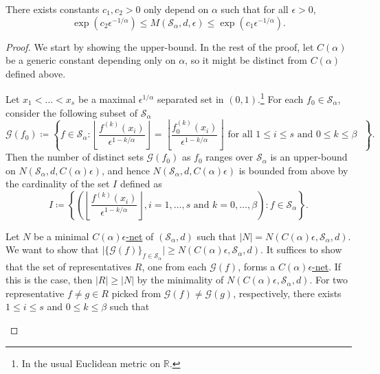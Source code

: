 \begin{theorem}\label{pf-thm:metric-entropy}
	There exists constants \(c_1, c_2 > 0\) only depend on \(\alpha \) such that for all \(\epsilon > 0\),
	\[
		\exp \left( c_2 \epsilon ^{-1 / \alpha } \right)
		\leq M(\mathcal{S} _\alpha , d, \epsilon )
		\leq \exp \left( c_1 \epsilon ^{-1 / \alpha } \right) .
	\]
\end{theorem}
\begin{proof}
	We start by showing the upper-bound. In the rest of the proof, let \(C(\alpha )\) be a generic constant depending only on \(\alpha \), so it might be distinct from \(C(\alpha )\) defined above.

	\begin{claim}\label{clm:metric-entropy-a}
		Let \(x_1 < \dots < x_s\) be a maximal \(\epsilon ^{1 / \alpha }\) separated set in \((0, 1)\).\footnote{In the usual Euclidean metric on \(\mathbb{R} \).} For each \(f_0 \in \mathcal{S} _\alpha \), consider the following subset of \(\mathcal{S} _\alpha \)
		\[
			\mathcal{G} (f_0) \coloneqq \left\{ f\in \mathcal{S} _\alpha \colon \left\lfloor \frac{f^{(k)}(x_i)}{\epsilon ^{1 - k / \alpha }} \right\rfloor = \left\lfloor \frac{f_0^{(k)}(x_i)}{\epsilon ^{1 - k / \alpha }} \right\rfloor \text{ for all \(1 \leq i \leq s\) and \(0 \leq k \leq \beta \) } \right\}.
		\]
		Then the number of distinct sets \(\mathcal{G} (f_0)\) as \(f_0\) ranges over \(\mathcal{S} _\alpha \) is an upper-bound on \(N(\mathcal{S} _\alpha , d, C(\alpha )\epsilon )\), and hence \(N(\mathcal{S} _\alpha , d, C(\alpha )\epsilon )\) is bounded from above by the cardinality of the set \(I\) defined as
		\[
			I \coloneqq \left\{ \left( \left\lfloor \frac{f^{(k)}(x_i)}{\epsilon ^{1 - k / \alpha }} \right\rfloor,i = 1, \dots , s \text{ and } k = 0, \dots , \beta  \right) \colon f\in \mathcal{S} _\alpha  \right\}.
		\]
	\end{claim}
	\begin{explanation}
		Let \(N\) be a minimal \hyperref[def:eps-net]{\(C(\alpha )\epsilon \)-net} of \((\mathcal{S} _\alpha , d )\) such that \(\vert N \vert = N(C(\alpha )\epsilon , \mathcal{S} _\alpha , d )\). We want to show that \(\vert \{ \mathcal{G} (f) \}_{f\in \mathcal{S} _\alpha } \vert \geq N(C(\alpha )\epsilon , \mathcal{S} _\alpha , d )\). It suffices to show that the set of representatives \(R\), one from each \(\mathcal{G} (f)\), forms a \hyperref[def:eps-net]{\(C(\alpha )\epsilon \)-net}. If this is the case, then \(\vert R \vert \geq \vert N \vert \) by the minimality of \(N(C(\alpha )\epsilon , \mathcal{S} _\alpha , d )\). For two representative \(f \neq g \in R\) picked from \(\mathcal{G} (f) \neq \mathcal{G} (g)\), respectively, there exists \(1 \leq i \leq s\) and \(0 \leq k \leq \beta \) such that

\end{explanation}
\end{proof}
